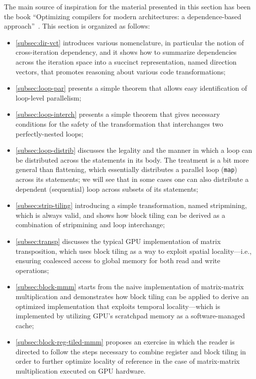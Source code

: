 \documentclass[acmsmall,review]{acmart}\settopmatter{printfolios=true,printccs=false,printacmref=false}
\begin{document}
The main source of inspiration for the material presented in this 
section has been the book 
``Optimizing compilers for modern architectures: a dependence-based approach''~\cite{kennedy2001optimizing}. 
This section is organized as follows:
\begin{itemize}
    \item \cref{subsec:dir-vct} introduces various nomenclature,
        in particular the notion of cross-iteration dependency, and 
        it shows how to summarize dependencies across the iteration 
        space into a succinct representation, named direction vectors, 
        that promotes reasoning about various code transformations;
    \item \cref{subsec:loop-par} presents a simple theorem
        that allows easy identification of loop-level parallelism;
    \item \cref{subsec:loop-interch} presents a simple
        theorem that gives necessary conditions for the safety 
        of the transformation that interchanges two perfectly-nested
        loops;
    \item \cref{subsec:loop-distrib} discusses the legality and
        the manner in which a loop can be distributed across the 
        statements in its body. The treatment is a bit more general
        than flattening, which essentially distributes a parallel loop
        (\lstinline{map}) across its statements; we will see that in 
        some cases one can also distribute a dependent (sequential) 
        loop across subsets of its statements;
    \item \cref{subsec:strip-tiling} introducing a simple
        transformation, named stripmining, which is always valid,
        and shows how block tiling can be derived as a combination
        of stripmining and loop interchange;
    \item \cref{subsec:transp} discusses the typical GPU 
        implementation of matrix transposition, which uses block
        tiling as a way to exploit spatial locality---i.e., 
        ensuring coalesced access to global memory for both read
        and write operations;
    \item \cref{subsec:block-mmm} starts from the naive implementation 
        of matrix-matrix multiplication and demonstrates how block tiling 
        can be applied to derive an optimized implementation that
        exploits temporal locality---which is implemented by utilizing
        GPU's scratchpad memory as a software-managed cache;
    \item \cref{subsec:block-reg-tiled-mmm} proposes an exercise in
        which the reader is directed to follow the steps necessary
        to combine register and block tiling in order to further optimize
        locality of reference in the case of matrix-matrix multiplication
        executed on GPU hardware.
\end{itemize}
\end{document}
